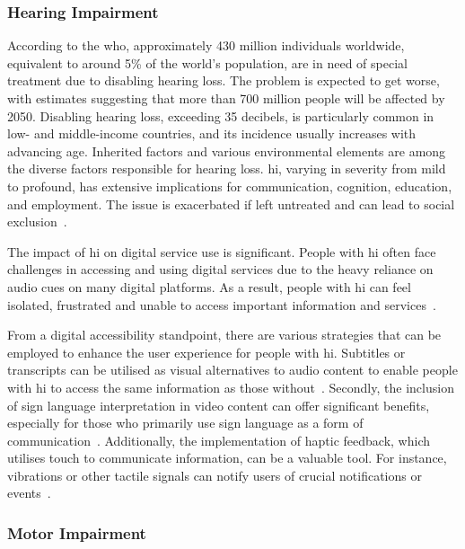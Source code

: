 \subsubsection{Hearing Impairment}
\label{sec:understanding:disabilities:hi}

According to the \ac{who}, approximately 430 million individuals worldwide, equivalent to around 5\% of the world's population, are in need of special treatment due to disabling hearing loss. The problem is expected to get worse, with estimates suggesting that more than 700 million people will be affected by 2050. Disabling hearing loss, exceeding 35 decibels, is particularly common in low- and middle-income countries, and its incidence usually increases with advancing age. Inherited factors and various environmental elements are among the diverse factors responsible for hearing loss. \Ac{hi}, varying in severity from mild to profound, has extensive implications for communication, cognition, education, and employment. The issue is exacerbated if left untreated and can lead to social exclusion~\cite{who_hi_2023}.

The impact of \ac{hi} on digital service use is significant. People with \ac{hi} often face challenges in accessing and using digital services due to the heavy reliance on audio cues on many digital platforms. As a result, people with \ac{hi} can feel isolated, frustrated and unable to access important information and services~\cite{arnaizsanchez_2023}.

From a digital accessibility standpoint, there are various strategies that can be employed to enhance the user experience for people with \ac{hi}. Subtitles or transcripts can be utilised as visual alternatives to audio content to enable people with \ac{hi} to access the same information as those without~\cite{hong_2010, hong_2011}. Secondly, the inclusion of sign language interpretation in video content can offer significant benefits, especially for those who primarily use sign language as a form of communication~\cite{debevc_2011}. Additionally, the implementation of haptic feedback, which utilises touch to communicate information, can be a valuable tool. For instance, vibrations or other tactile signals can notify users of crucial notifications or events~\cite{nanayakkara_2013}.

\subsubsection{Motor Impairment}
\label{sec:understanding:disabilities:mi}

